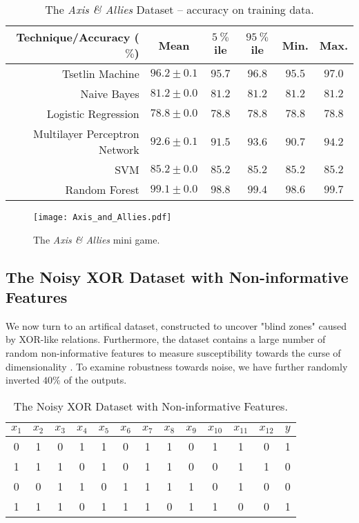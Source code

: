 \documentclass[11pt,a4paper]{article}
\begin{document}
\begin{table}[!bh]
    \centering
    \begin{tabular}{r||c|c|c|c|c}
         \bf Technique/Accuracy ($\%$)&\bf Mean&\bf $5~\%$ile &\bf $95~\%$ile&\bf Min.&\bf Max.\\
         \hline
    Tsetlin Machine&$96.2 \pm 0.1$&$95.7$&$96.8$&$95.5$&$97.0$\\
    Naive Bayes&$81.2 \pm 0.0$&$81.2$&$81.2$&$81.2$&$81.2$\\
    Logistic Regression&$78.8 \pm 0.0$&$78.8$&$78.8$&$78.8$&$78.8$\\
    Multilayer Perceptron Network&$92.6 \pm 0.1$&$91.5$&$93.6$&$90.7$&$94.2$\\
    SVM&$85.2 \pm 0.0$&$85.2$&$85.2$&$85.2$&$85.2$\\
    Random Forest&$99.1 \pm 0.0$&$98.8$&$99.4$&$98.6$&$99.7$
    \end{tabular}
    \caption{The \emph{Axis \& Allies} Dataset -- accuracy on training data.}
    \label{tab:aa_training}
\end{table}

\begin{figure}[!th]
\centering
\texttt{[image: Axis\_and\_Allies.pdf]}
\caption{The \emph{Axis \& Allies} mini game.}
\label{figure:axis_and_allies_minigame}
\end{figure}

\subsection{The Noisy XOR Dataset with Non-informative Features}

We now turn to an artifical dataset, constructed to uncover "blind zones" caused by XOR-like relations. Furthermore, the dataset contains a large number of random non-informative features to measure susceptibility towards the curse of dimensionality \cite{Duda2000}. To examine robustness towards noise, we have further randomly inverted $40\%$ of the outputs.

\begin{table}[!bh]
    \centering
    \begin{tabular}{c|c|c|c|c|c|c|c|c|c|c|c||c}
    \bf $x_1$&\bf $x_2$&\bf $x_3$&\bf $x_4$&\bf $x_5$&\bf $x_6$&\bf $x_7$&\bf $x_8$&\bf $x_9$&\bf $x_{10}$&\bf $x_{11}$&\bf $x_{12}$&\bf $y$\\
    \hline
    \hline
    0&1&0&1&1&0&1&1&0&1&1&0&1\\
    1&1&1&0&1&0&1&1&0&0&1&1&0\\
    0&0&1&1&0&1&1&1&1&0&1&0&0\\
    1&1&1&0&1&1&1&0&1&1&0&0&1
    \end{tabular}
    \caption{The Noisy XOR Dataset with Non-informative Features.}
    \label{tab:noisy_xor_dataset}
\end{table}
\end{document}
